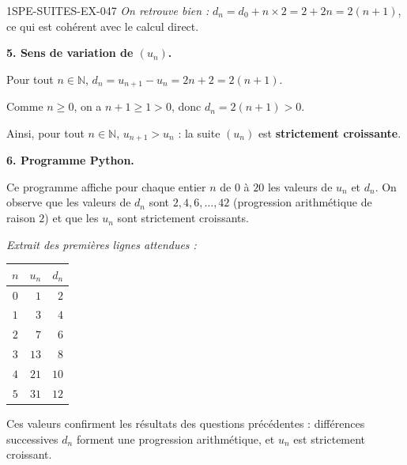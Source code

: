 \begin{corrige}{1SPE-SUITES-EX-047}
\textit{On retrouve bien :} $d_n = d_0 + n \times 2 = 2 + 2n = 2(n+1)$, ce qui est cohérent avec le calcul direct.

\textbf{5. Sens de variation de $(u_n)$.}

Pour tout $n \in \mathbb{N}$, $d_n = u_{n+1} - u_n = 2n + 2 = 2(n+1)$.

Comme $n \geq 0$, on a $n + 1 \geq 1 > 0$, donc $d_n = 2(n+1) > 0$.

Ainsi, pour tout $n \in \mathbb{N}$, $u_{n+1} > u_n$ : la suite $(u_n)$ est \textbf{strictement croissante}.

\textbf{6. Programme Python.}



Ce programme affiche pour chaque entier $n$ de $0$ à $20$ les valeurs de $u_n$ et $d_n$. On observe que les valeurs de $d_n$ sont $2, 4, 6, \ldots, 42$ (progression arithmétique de raison $2$) et que les $u_n$ sont strictement croissants.

\textit{Extrait des premières lignes attendues :}
\begin{center}
\begin{tabular}{|c|r|r|}
\hline
$n$ & $u_n$ & $d_n$ \\
\hline
$0$ & $1$ & $2$ \\
$1$ & $3$ & $4$ \\
$2$ & $7$ & $6$ \\
$3$ & $13$ & $8$ \\
$4$ & $21$ & $10$ \\
$5$ & $31$ & $12$ \\
\hline
\end{tabular}
\end{center}

Ces valeurs confirment les résultats des questions précédentes : différences successives $d_n$ forment une progression arithmétique, et $u_n$ est strictement croissant.

\end{corrige}
